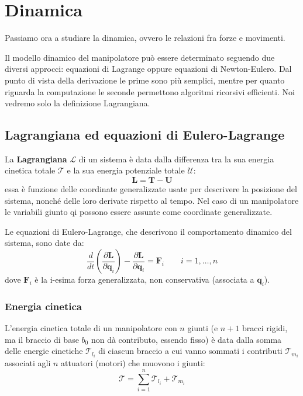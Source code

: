 \chapter{Dinamica}

Passiamo ora a studiare la dinamica, ovvero le relazioni fra forze e movimenti.

Il modello dinamico del manipolatore può essere determinato seguendo due diversi approcci: equazioni di Lagrange oppure equazioni di Newton-Eulero. Dal punto di vista della derivazione le prime sono più semplici, mentre per quanto riguarda la computazione le seconde permettono algoritmi ricorsivi efficienti. Noi vedremo solo la definizione Lagrangiana.



\section{Lagrangiana ed equazioni di Eulero-Lagrange}

La \textbf{Lagrangiana} $\mathcal{L}$ di un sistema è data dalla differenza tra la sua energia cinetica totale $\mathcal{T}$ e la sua energia potenziale totale $\mathcal{U}$:
$$
\mathcal{\bm{L = T - U}}
$$
essa è funzione delle coordinate generalizzate usate per descrivere la posizione del sistema, nonché delle loro derivate rispetto al tempo. Nel caso di un manipolatore le variabili giunto qi possono essere assunte come coordinate generalizzate. 

Le equazioni di Eulero-Lagrange, che descrivono il comportamento dinamico del sistema, sono date da:
$$
\frac{d}{dt}\left(\frac{\partial \mathcal{\bm{L}}}{\partial \dot{\bm{q}}_i}\right)
-
\frac{\partial \mathcal{\bm{L}}}{\partial \bm{q}_i}
=
\mathcal{\bm{F}}_i
\qquad
i = 1, \dots, n
$$
dove $\mathcal{\bm{F}}_i$ è la i-esima forza generalizzata, non conservativa (associata a $\bm{q}_i$).



\subsection{Energia cinetica}

L’energia cinetica totale di un manipolatore con $n$ giunti (e $n + 1$ bracci rigidi, ma il braccio di base $b_0$ non dà contributo, essendo fisso) è data dalla somma delle energie cinetiche $\mathcal{T}_{l_i}$ di ciascun braccio a cui vanno sommati i contributi $\mathcal{T}_{m_i}$ associati agli $n$ attuatori (motori) che muovono i giunti:
\begin{equation}\label{eq:kin_energy_sum}
\mathcal{T} = \sum_{i=1}^n \mathcal{T}_{l_i} + \mathcal{T}_{m_i}
\end{equation}


